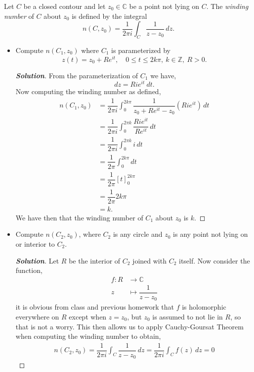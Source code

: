 \documentclass[11pt]{article}
\newenvironment{problem}[2][Problem\!]{\begin{trivlist}
\item[\hskip \labelsep {\bfseries #1}\hskip \labelsep {\bfseries #2}]}{\end{trivlist}}
\newenvironment{solution}{\begin{proof}[\textbf{\textit{Solution}}] }{\end{proof}}
\newcommand{\zz}{\mathbb Z}   %
\newcommand{\cc}{\mathbb C}   %
\renewcommand{\leq}{\leqslant}
\newcommand{\lrb}[1]{\left[#1\right]}
\begin{document}
\begin{problem}{7.3}
Let $C$ be a closed contour and let $z_0 \in \cc$ be a point not lying on $C$. The \emph{winding number} of $C$ about $z_0$ is defined by the integral
\[n(C,z_0) = \frac{1}{2\pi i}\int_C \frac{1}{z-z_0} \, dz.\]
\begin{itemize}[itemsep=3em]
\item[(a)] Compute $n(C_1,z_0)$ where $C_1$ is parameterized by \[z(t) = z_0 + Re^{it},\quad 0 \leq t \leq 2k\pi,\ k\in \zz,\ R>0.\] 
\begin{solution}
  From the parameterization of $C_1$ we have,
  \[dz = Rie^{it} \ dt. \]
  Now computing the winding number as defined,
  \begin{align*}
    n(C_1, z_0) &= \dfrac{1}{2\pi i }\int_0^{2k \pi}\dfrac{1}{z_0 + Re^{it} -z_0} (Ri e^{it})\, d t \\
    &= \dfrac{1}{2\pi i }\int_0^{2\pi k }\dfrac{Ri e^{it}}{R e^{it}}\, d t \\
    &= \dfrac{1}{2\pi i}\int_0^{2\pi k}i \, d t \\
    &= \dfrac{1}{2\pi}\int_0^{2k\pi }d t \\
    &= \dfrac{1}{2\pi}\lrb{t}_0^{2k\pi} \\
    &= \dfrac{1}{2\pi}2k\pi \\
    &= k.
  \end{align*}
  We have then that the  winding number of $C_1$ about $z_0$ is $k$. 
\end{solution}

\item[(b)] Compute $n(C_2,z_0)$, where $C_2$ is any circle and $z_0$ is any point not lying on or interior to $C_2$. 
\begin{solution}
   Let $R$ be the interior of $C_2$ joined with $C_2$ itself. Now consider the function,
   \begin{align*}
     f: R &\to \cc \\
     z &\mapsto \dfrac{1}{z-z_0}
   \end{align*} 
   it is obvious from class and previous homework that $f$ is holomorphic everywhere on $R$ except when $z= z_0$, but $z_0$ is assumed to not lie in $R$, so that is not a worry. This then allows us to apply Cauchy-Goursat Theorem when computing the winding number to obtain,
   \begin{align*}
      n(C_2, z_0) = \dfrac{1}{2\pi i }\int_C \dfrac{1}{z-z_0}\, dz = \dfrac{1}{2\pi i }\int_C f(z)\, dz = 0 
   \end{align*} 
\end{solution}


\end{itemize}
\end{problem}
\end{document}
